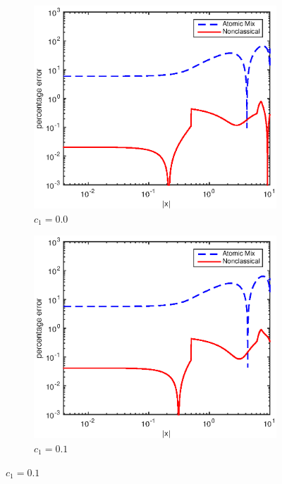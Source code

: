 \documentclass[12pt]{article}
\begin{document}
{\begin{figure}[p]
    \centering
    \begin{subfigure}{0.495\textwidth}
        \centering
        \includegraphics[width=\textwidth]{NSE_err_f00.eps}
        \caption{$c_1 = 0.0$}
        \label{figerrF00}
    \end{subfigure}
    \hfill
    \begin{subfigure}{0.495\textwidth}
        \centering
        \includegraphics[width=\textwidth]{NSE_err_F10.eps}
        \caption{$c_1 = 0.1$}

\end{subfigure}
\end{figure}}
\end{document}
